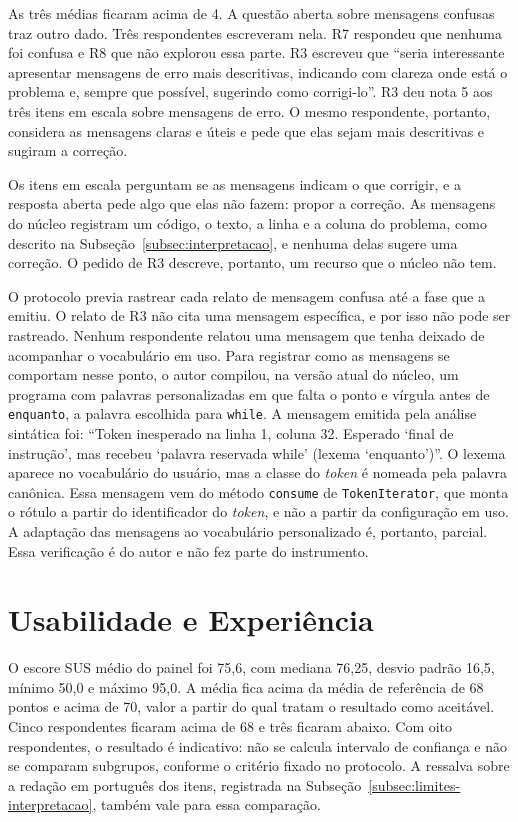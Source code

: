 As três médias ficaram acima de 4. A questão aberta sobre mensagens confusas traz outro dado. Três respondentes escreveram nela. R7 respondeu que nenhuma foi confusa e R8 que não explorou essa parte. R3 escreveu que ``seria interessante apresentar mensagens de erro mais descritivas, indicando com clareza onde está o problema e, sempre que possível, sugerindo como corrigi-lo''. R3 deu nota 5 aos três itens em escala sobre mensagens de erro. O mesmo respondente, portanto, considera as mensagens claras e úteis e pede que elas sejam mais descritivas e sugiram a correção.

Os itens em escala perguntam se as mensagens indicam o que corrigir, e a resposta aberta pede algo que elas não fazem: propor a correção. As mensagens do núcleo registram um código, o texto, a linha e a coluna do problema, como descrito na Subseção~\ref{subsec:interpretacao}, e nenhuma delas sugere uma correção. O pedido de R3 descreve, portanto, um recurso que o núcleo não tem.

O protocolo previa rastrear cada relato de mensagem confusa até a fase que a emitiu. O relato de R3 não cita uma mensagem específica, e por isso não pode ser rastreado. Nenhum respondente relatou uma mensagem que tenha deixado de acompanhar o vocabulário em uso. Para registrar como as mensagens se comportam nesse ponto, o autor compilou, na versão atual do núcleo, um programa com palavras personalizadas em que falta o ponto e vírgula antes de \texttt{enquanto}, a palavra escolhida para \texttt{while}. A mensagem emitida pela análise sintática foi: ``Token inesperado na linha 1, coluna 32. Esperado `final de instrução', mas recebeu `palavra reservada while' (lexema `enquanto')''. O lexema aparece no vocabulário do usuário, mas a classe do \textit{token} é nomeada pela palavra canônica. Essa mensagem vem do método \texttt{consume} de \texttt{TokenIterator}, que monta o rótulo a partir do identificador do \textit{token}, e não a partir da configuração em uso. A adaptação das mensagens ao vocabulário personalizado é, portanto, parcial. Essa verificação é do autor e não fez parte do instrumento.

\section{Usabilidade e Experiência}
\label{sec:resultado-usabilidade}

O escore SUS médio do painel foi 75,6, com mediana 76,25, desvio padrão 16,5, mínimo 50,0 e máximo 95,0. A média fica acima da média de referência de 68 pontos \cite{sauro2012} e acima de 70, valor a partir do qual  tratam o resultado como aceitável. Cinco respondentes ficaram acima de 68 e três ficaram abaixo. Com oito respondentes, o resultado é indicativo: não se calcula intervalo de confiança e não se comparam subgrupos, conforme o critério fixado no protocolo. A ressalva sobre a redação em português dos itens, registrada na Subseção~\ref{subsec:limites-interpretacao}, também vale para essa comparação.

